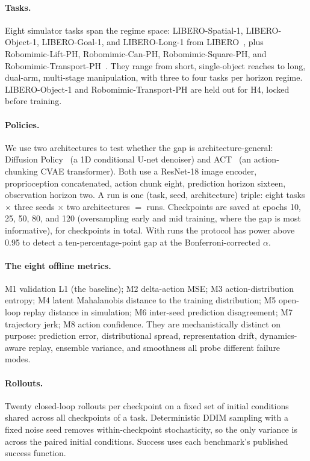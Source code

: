 \paragraph{Tasks.} Eight simulator tasks span the regime space: LIBERO-Spatial-1,
LIBERO-Object-1, LIBERO-Goal-1, and LIBERO-Long-1 from LIBERO~\citep{liu2023libero}, plus
Robomimic-Lift-PH, Robomimic-Can-PH, Robomimic-Square-PH, and
Robomimic-Transport-PH~\citep{mandlekar2021}. They range from short, single-object reaches to
long, dual-arm, multi-stage manipulation, with three to four tasks per horizon regime.
LIBERO-Object-1 and Robomimic-Transport-PH are held out for H4, locked before training.

\paragraph{Policies.} We use two architectures to test whether the gap is
architecture-general: Diffusion Policy~\citep{chi2023diffusion} (a 1D conditional U-net
denoiser) and ACT~\citep{zhao2023act} (an action-chunking CVAE transformer). Both use a
ResNet-18 image encoder, proprioception concatenated, action chunk eight, prediction horizon
sixteen, observation horizon two. A run is one (task, seed, architecture) triple: eight tasks
$\times$ three seeds $\times$ two architectures $=$ \NRuns{} runs. Checkpoints are saved at
epochs 10, 25, 50, 80, and 120 (oversampling early and mid training, where the gap is most
informative), for \NCheckpoints{} checkpoints in total. With \NRuns{} runs the protocol has
power above 0.95 to detect a ten-percentage-point gap at the Bonferroni-corrected $\alpha$.

\paragraph{The eight offline metrics.} M1 validation L1 (the baseline); M2 delta-action MSE;
M3 action-distribution entropy; M4 latent Mahalanobis distance to the training distribution;
M5 open-loop replay distance in simulation; M6 inter-seed prediction disagreement; M7
trajectory jerk; M8 action confidence. They are mechanistically distinct on purpose:
prediction error, distributional spread, representation drift, dynamics-aware replay,
ensemble variance, and smoothness all probe different failure modes.

\paragraph{Rollouts.} Twenty closed-loop rollouts per checkpoint on a fixed set of initial
conditions shared across all checkpoints of a task. Deterministic DDIM sampling with a fixed
noise seed removes within-checkpoint stochasticity, so the only variance is across the paired
initial conditions. Success uses each benchmark's published success function.

